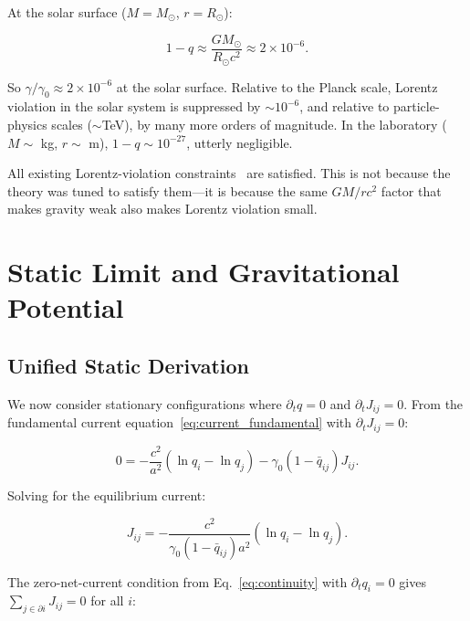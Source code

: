 \documentclass[aps,prd,twocolumn,showpacs,superscriptaddress,preprintnumbers]{revtex4-2}
\begin{document}
At the solar surface ($M=M_\odot$, $r=R_\odot$):

\begin{equation}
1 - q \approx \frac{GM_\odot}{R_\odot c^2} \approx 2 \times 10^{-6}.
\label{eq:solar_lv}
\end{equation}

So $\gamma/\gamma_0 \approx 2\times 10^{-6}$ at the solar surface.
Relative to the Planck scale, Lorentz violation in the solar system is suppressed by $\sim 10^{-6}$, and relative to particle-physics scales ($\sim$TeV), by many more orders of magnitude.
In the laboratory ($M\sim$ kg, $r\sim$ m), $1-q\sim 10^{-27}$, utterly negligible.

All existing Lorentz-violation constraints~\cite{Kostelecky:2008,Mewes:2013} are satisfied.
This is not because the theory was tuned to satisfy them---it is because the same $GM/rc^2$ factor that makes gravity weak also makes Lorentz violation small.

\section{Static Limit and Gravitational Potential}
\label{sec:static}

\subsection{Unified Static Derivation}

We now consider stationary configurations where $\partial_t q=0$ and $\partial_t J_{ij}=0$.
From the fundamental current equation~\eqref{eq:current_fundamental} with $\partial_t J_{ij}=0$:

\begin{equation}
0 = -\frac{c^2}{a^2}(\ln q_i - \ln q_j) - \gamma_0(1-\bar{q}_{ij})J_{ij}.
\label{eq:static_J_eq}
\end{equation}

Solving for the equilibrium current:

\begin{equation}
J_{ij} = -\frac{c^2}{\gamma_0(1-\bar{q}_{ij})a^2}(\ln q_i - \ln q_j).
\label{eq:J_static}
\end{equation}

The zero-net-current condition from Eq.~\eqref{eq:continuity} with $\partial_t q_i=0$ gives $\sum_{j\in\partial i}J_{ij}=0$ for all $i$:
\end{document}
